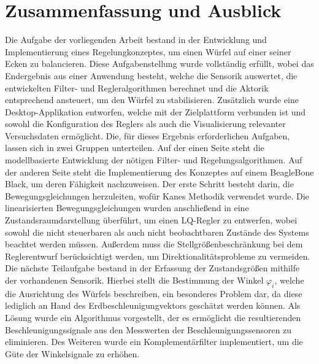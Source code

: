\chapter{Zusammenfassung und Ausblick}
Die Aufgabe der vorliegenden Arbeit bestand in der Entwicklung und Implementierung eines Regelungkonzeptes, um einen Würfel auf einer seiner Ecken zu balancieren. Diese Aufgabenstellung wurde vollständig erfüllt, wobei das Endergebnis aus einer Anwendung besteht, welche die Sensorik auswertet, die entwickelten Filter- und Regleralgorithmen berechnet und die Aktorik entsprechend ansteuert, um den Würfel zu stabilisieren. Zusätzlich wurde eine Desktop-Applikation entworfen, welche mit der Zielplattform verbunden ist und sowohl die Konfiguration des Reglers als auch die Visualisierung relevanter Versuchsdaten ermöglicht. Die, für dieses Ergebnis erforderlichen Aufgaben, lassen sich in zwei Gruppen unterteilen. Auf der einen Seite steht die modellbasierte Entwicklung der nötigen Filter- und Regelungsalgorithmen. Auf der anderen Seite steht die Implementierung des Konzeptes auf einem BeagleBone Black, um deren Fähigkeit nachzuweisen.
Der erste Schritt besteht darin, die Bewegungsgleichungen herzuleiten, wofür Kanes Methodik verwendet wurde. Die linearisierten Bewegungsgleichungen wurden anschließend in eine Zustandsraumdarstellung überführt, um einen LQ-Regler zu entwerfen, wobei sowohl die nicht steuerbaren als auch nicht beobachtbaren Zustände des Systems beachtet werden müssen. Außerdem muss die Stellgrößenbeschränkung bei dem Reglerentwurf berücksichtigt werden, um Direktionalitätsprobleme zu vermeiden.
Die nächste Teilaufgabe bestand in der Erfassung der Zustandsgrößen mithilfe der vorhandenen Sensorik. Hierbei stellt die Bestimmung der Winkel $\varphi_i$, welche die Ausrichtung des Würfels beschreiben, ein besonderes Problem dar, da diese lediglich an Hand des Erdbeschleunigungvektors geschätzt werden können. Als Lösung wurde ein Algorithmus vorgestellt, der es ermöglicht die resultierenden Beschleunigungssignale aus den Messwerten der Beschleunigungssensoren zu eliminieren. Des Weiteren wurde ein Komplementärfilter implementiert, um die Güte der Winkelsignale zu erhöhen.

